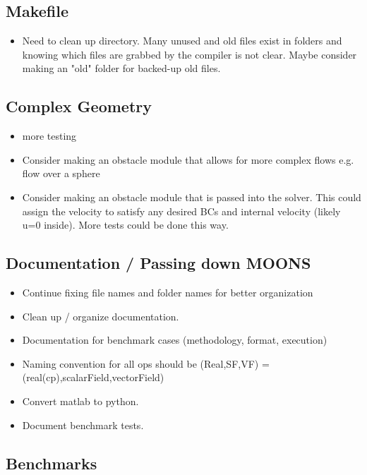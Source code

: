 \documentclass[11pt]{article}
\begin{document}
\subsection{Makefile}
\begin{itemize}
\setlength\itemsep{-1em}
\item Need to clean up directory. Many unused and old files exist in folders and knowing which files are grabbed by the compiler is not clear. Maybe consider making an "old" folder for backed-up old files.
\end{itemize}

\subsection{Complex Geometry}
\begin{itemize}
\setlength\itemsep{-1em}
\item more testing
\item Consider making an obstacle module that allows for more complex flows
e.g. flow over a sphere
\item Consider making an obstacle module that is passed into the solver.
This could assign the velocity to satisfy any desired BCs and internal
velocity (likely u=0 inside). More tests could be done this way.
\end{itemize}

\subsection{Documentation / Passing down MOONS}
\begin{itemize}
\setlength\itemsep{-1em}
\item Continue fixing file names and folder names for better organization
\item Clean up / organize documentation.
\item Documentation for benchmark cases (methodology, format, execution)
\item Naming convention for all ops should be (Real,SF,VF) = (real(cp),scalarField,vectorField)
\item Convert matlab to python.
\item Document benchmark tests.
\end{itemize}

\subsection{Benchmarks}
\end{document}

